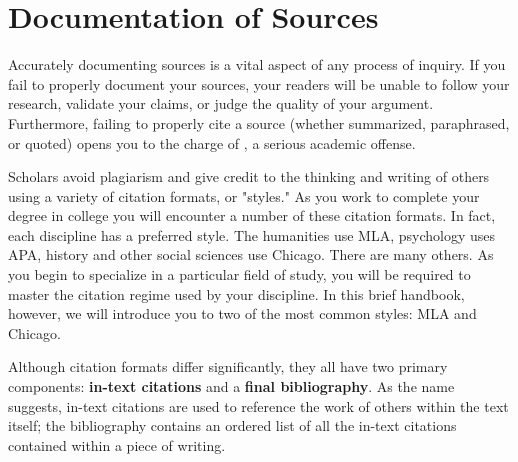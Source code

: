 
\hypertarget{citation}{}

\chapter{Documentation of Sources}

Accurately documenting sources is a vital aspect of any process of inquiry. If
you fail to  properly document your sources, your readers will be unable to
follow your research,  validate your claims, or judge the quality of your
argument. Furthermore, failing to  properly cite a source (whether summarized,
paraphrased, or quoted) opens you to the  charge of
\hyperlink{plagiarism}{\color{Ahrenge}{plagiarism}}, a serious academic offense.

Scholars avoid plagiarism and give credit to the thinking and writing of others
using a  variety of citation formats, or "styles." As you work to complete your
degree in college  you will encounter a number of these citation formats. In
fact, each discipline has a  preferred style. The humanities use MLA, psychology
uses APA, history and other social  sciences use Chicago. There are many others.
As you begin to specialize in a particular  field of study, you will be required
to master the citation regime used by your discipline.  In this brief handbook,
however, we will introduce you to two of the most common  styles: MLA and
Chicago.

Although citation formats differ significantly, they all have two primary
components:  \textbf{in-text citations} and a \textbf{final bibliography}. As
the name suggests, in-text  citations are used to reference the work of others
within the text itself; the  bibliography contains an ordered list of all the
in-text citations contained within a  piece of writing.

